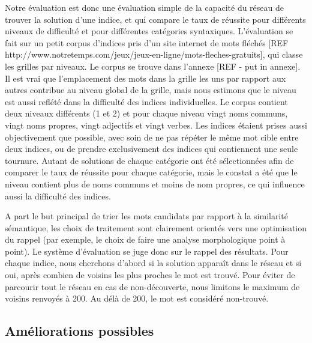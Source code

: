 Notre évaluation est donc une évaluation simple de la capacité du réseau de trouver la solution d'une indice, et qui compare le taux de réussite pour différents niveaux de difficulté et pour différentes catégories syntaxiques. L'évaluation se fait sur un petit corpus d'indices pris d'un site internet de mots fléchés [REF http://www.notretemps.com/jeux/jeux-en-ligne/mots-fleches-gratuits], qui classe les grilles par niveaux. Le corpus se trouve dans l'annexe [REF - put in annexe]. Il est vrai que l'emplacement des mots dans la grille les uns par rapport aux autres contribue au niveau global de la grille, mais nous estimons que le niveau est aussi reflété dans la difficulté des indices individuelles. Le corpus contient deux niveaux différents (1 et 2) et pour chaque niveau vingt noms communs, vingt noms propres, vingt adjectifs et vingt verbes. Les indices étaient prises aussi objectivement que possible, avec soin de ne pas répéter le même mot cible entre deux indices, ou de prendre exclusivement des indices qui contiennent une seule tournure. Autant de solutions de chaque catégorie ont été sélectionnées afin de comparer le taux de réussite pour chaque catégorie, mais le constat a été que le niveau contient plus de noms communs et moins de nom propres, ce qui influence aussi la difficulté des indices.

A part le but principal de trier les mots candidats par rapport à la similarité sémantique, les choix de traitement sont clairement orientés vers une optimisation du rappel (par exemple, le choix de faire une analyse morphologique point à point). Le système d'évaluation se juge donc sur le rappel des résultats. Pour chaque indice, nous cherchons d'abord si la solution apparaît dans le réseau et si oui, après combien de voisins les plus proches le mot est trouvé. Pour éviter de parcourir tout le réseau en cas de non-découverte, nous limitons le maximum de voisins renvoyés à 200. Au délà de 200, le mot est considéré non-trouvé. 





\subsection{Améliorations possibles}
